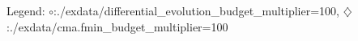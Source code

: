 Legend: {\color{NavyBlue}$\circ$}:./exdata/differential\_evolution\_budget\_multiplier=100, {\color{Magenta}$\diamondsuit$}:./exdata/cma.fmin\_budget\_multiplier=100
